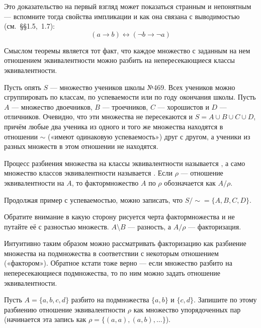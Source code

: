 Это доказательство на первый взгляд может показаться странным и непонятным — вспомните тогда свойства импликации и как она связана с выводимостью (см.~\S\S1.5,~1.7):
$$(a\rightarrow b) \leftrightarrow (\neg b \rightarrow \neg a)$$

Смыслом теоремы является тот факт, что каждое множество с заданным на нем отношением эквивалентности можно разбить на непересекающиеся классы эквивалентности.

\begin{example}
Пусть опять $S$ — множество учеников школы №469. Всех учеников можно сгруппировать по классам, по успеваемости или по году окончания школы. Пусть $A$ — множество двоечников, $B$ — троечников, $C$ — хорошистов и $D$ — отличников. Очевидно, что эти множества не пересекаются и $S = A\cup B\cup C\cup D$, причём любые два ученика из одного и того же множества находятся в отношении $\sim$ («имеют одинаковую успеваемость») друг с другом, а ученики из разных множеств в этом отношении не находятся.
\end{example}

\begin{definition}
Процесс разбиения множества на классы эквивалентности называется , а само множество классов эквивалентности называется . Если $\rho$ — отношение эквивалентности на $A$, то фактормножество $A$ по $\rho$ обозначается как $A/\rho$.
\end{definition}

\begin{example}
Продолжая пример с успеваемостью, можно записать, что $S/\sim = \{A, B, C, D\}$.
\end{example}

Обратите внимание в какую сторону рисуется черта фактормножества и не путайте её с разностью множеств. $A\setminus B$ — разность, а $A/\rho$ — факторизация.

Интуитивно таким образом можно рассматривать факторизацию как разбиение множества на подмножества в соответствии с некоторым отношением («фактором»). Обратное кстати тоже верно — если множество разбито на непересекающиеся подмножества, то по ним можно задать отношение эквивалентности.

\begin{exercise}
Пусть $A = \{a, b, c, d\}$ разбито на подмножества $\{a, b\}$ и $\{c, d\}$. Запишите по этому разбиению отношение эквивалентности $\rho$ как множество упорядоченных пар (начинается эта запись как $\rho = \{(a, a), (a, b), \ldots\}$).
\end{exercise}

